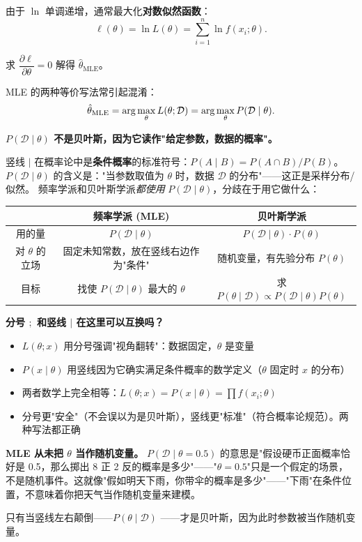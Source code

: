 由于 $\ln$ 单调递增，通常最大化\textbf{对数似然函数}：
\begin{equation}
    \ell(\theta) = \ln L(\theta) = \sum_{i=1}^{n} \ln f(x_i; \theta).
\end{equation}

求 $\dfrac{\partial \ell}{\partial \theta} = 0$ 解得 $\hat{\theta}_{\mathrm{MLE}}$。

\begin{remark}
MLE 的两种等价写法常引起混淆：
\[
\hat{\theta}_{\mathrm{MLE}} = \arg\max_\theta L(\theta; \mathcal{D})
                           = \arg\max_\theta P(\mathcal{D} \mid \theta).
\]

\textbf{$P(\mathcal{D} \mid \theta)$ 不是贝叶斯，因为它读作"给定参数，数据的概率"。}

竖线 $|$ 在概率论中是\textbf{条件概率}的标准符号：$P(A \mid B) = P(A \cap B) / P(B)$。
$P(\mathcal{D} \mid \theta)$ 的含义是："当参数取值为 $\theta$ 时，数据 $\mathcal{D}$ 的分布"——这正是采样分布/似然。
频率学派和贝叶斯学派\emph{都使用} $P(\mathcal{D} \mid \theta)$，分歧在于用它做什么：

\begin{center}
\renewcommand{\arraystretch}{1.4}
\begin{tabular}{c|c|c}
\toprule
& \textbf{频率学派 (MLE)} & \textbf{贝叶斯学派} \\
\midrule
用的量          & $P(\mathcal{D} \mid \theta)$ & $P(\mathcal{D} \mid \theta) \cdot P(\theta)$ \\
对 $\theta$ 的立场 & 固定未知常数，放在竖线右边作为"条件" & 随机变量，有先验分布 $P(\theta)$ \\
目标            & 找使 $P(\mathcal{D} \mid \theta)$ 最大的 $\theta$ & 求 $P(\theta \mid \mathcal{D}) \propto P(\mathcal{D} \mid \theta)P(\theta)$ \\
\bottomrule
\end{tabular}
\end{center}

\textbf{分号 $;$ 和竖线 $|$ 在这里可以互换吗？}

\begin{itemize}
    \item $L(\theta; x)$ 用分号强调"视角翻转"：数据固定，$\theta$ 是变量
    \item $P(x \mid \theta)$ 用竖线因为它确实满足条件概率的数学定义（$\theta$ 固定时 $x$ 的分布）
    \item 两者数学上完全相等：$L(\theta; x) = P(x \mid \theta) = \prod f(x_i; \theta)$
    \item 分号更"安全"（不会误以为是贝叶斯），竖线更"标准"（符合概率论规范）。两种写法都正确
\end{itemize}

\textbf{MLE 从未把 $\theta$ 当作随机变量。} $P(\mathcal{D} \mid \theta = 0.5)$ 的意思是"假设硬币正面概率恰好是 0.5，那么掷出 8 正 2 反的概率是多少"——"$\theta = 0.5$"只是一个假定的场景，不是随机事件。这就像"假如明天下雨，你带伞的概率是多少"——"下雨"在条件位置，不意味着你把天气当作随机变量来建模。

只有当竖线左右颠倒——$P(\theta \mid \mathcal{D})$ ——才是贝叶斯，因为此时参数被当作随机变量。
\end{remark}

